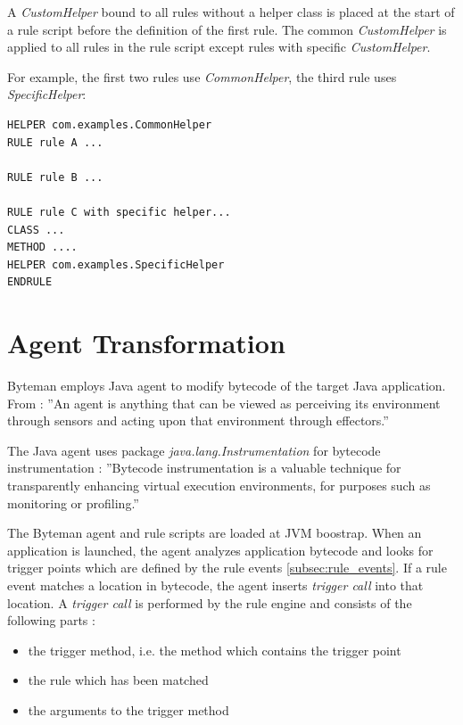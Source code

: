\documentclass[12pt,oneside]{fithesis2}
\begin{document}
A \textit{CustomHelper} bound to all rules without a helper class is placed at the start of a rule script before the definition of the first rule. The common \textit{CustomHelper} is applied to all rules in the rule script except rules with specific \textit{CustomHelper}.

For example, the first two rules use \textit{CommonHelper}, the third rule uses \textit{SpecificHelper}:
\begin{lstlisting}[caption = Rules with common helper, label = rules_common_helper]
HELPER com.examples.CommonHelper
RULE rule A ...

RULE rule B ...

RULE rule C with specific helper...
CLASS ...
METHOD ....
HELPER com.examples.SpecificHelper
ENDRULE
\end{lstlisting}

\section{Agent Transformation}
Byteman employs Java agent to modify bytecode of the target Java application. From \cite{agent_def}: ''An agent is anything that can be viewed as perceiving its environment through sensors and acting upon that environment through effectors.''

The Java agent uses package \textit{java.lang.Instrumentation} for bytecode instrumentation \cite{instrumentation}: ''Bytecode instrumentation is a valuable technique for transparently enhancing virtual execution environments, for purposes such as monitoring or profiling.''

The Byteman agent and rule scripts are loaded at JVM boostrap. When an application is launched, the agent analyzes application bytecode and looks for trigger points which are defined by the rule events \ref{subsec:rule_events}. If a rule event matches a location in bytecode, the agent inserts \textit{trigger call} into that location. A \textit{trigger call} is performed by the rule engine and consists of the following parts \cite[Agent Transformation]{byteman_doc}:

\begin{itemize}
	\item	the trigger method, i.e. the method which contains the trigger point
	\item	the rule which has been matched
	\item	the arguments to the trigger method
\end{itemize}
\end{document}
